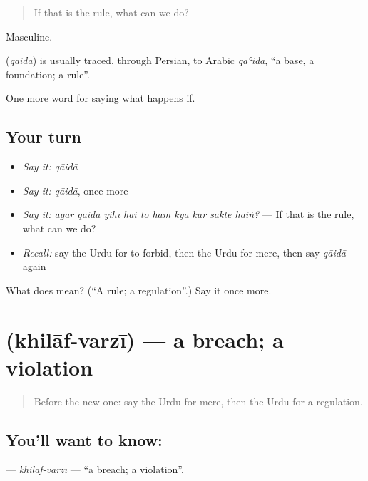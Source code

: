 \begin{quote}
If that is the rule, what can we do?
\end{quote}

Masculine.

\begin{cousinweb}
\textbf{} (\emph{qāidā}) is usually traced, through Persian, to Arabic \emph{qāʿida}, \textquotedblleft{}a base, a foundation; a rule\textquotedblright{}.
\end{cousinweb}

\begin{grammarlens}[title={What you've built}]
One more word for saying what happens if.
\end{grammarlens}

\subsection*{Your turn}
\begin{itemize}
\raggedright
  \item \emph{Say it:} \emph{qāidā}
  \item \emph{Say it:} \emph{qāidā}, once more
  \item \emph{Say it:} \emph{agar qāidā yihī hai to ham kyā kar sakte haiṅ?} — If that is the rule, what can we do?
  \item \emph{Recall:} say the Urdu for to forbid, then the Urdu for mere, then say \emph{qāidā} again
\end{itemize}

\begin{tcolorbox}[breakable,colback=teal!4,colframe=teal!35!black,title={Before you move on}]
What does  mean? (\textquotedblleft{}A rule; a regulation\textquotedblright{}.) Say it once more.
\end{tcolorbox}
\section[\texorpdfstring{\ur{خلاف} \ur{ورزی} (khilāf-varzī)}{خلاف ورزی (khilāf-varzī)}]{  (khilāf-varzī) — a breach; a violation}

\label{lesson:UR-C367-khilaf-varzi}



\begin{quote}
Before the new one: say the Urdu for mere, then the Urdu for a regulation.
\end{quote}

\subsection*{You'll want to know:  }
\textbf{ } — \emph{khilāf-varzī} — \textquotedblleft{}a breach; a violation\textquotedblright{}.

